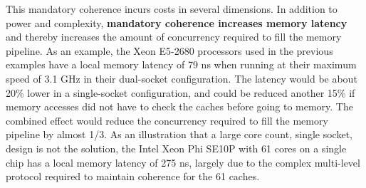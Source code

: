 \begin{comment}
  \heading{Some Hidden Costs of Cache Coherence}

  A general principle in computer architecture is that implementations should be optimized 
  based on the common case and only deal with the unusual case when it happens.   
  Cache coherence is perhaps the most notable exception to this guideline.  Even though
  the overwhelming majority of memory references are to addresses that are not shared
  across processes, architectures provide no means for software to tell hardware that 
  snooping is not required.  As a consequence, the address of every last-level cache miss
  is broadcast to all other last-level caches in the system to ensure that no modified copies
  of the corresponding cache line exist elsewhere in the system.  This mechanism is clearly
  required for shared-memory communication to work, and is just as clearly not needed
  when data is not shared.  (Process migration is a special case that can easily be handled
  by selective cache flushing.)  
\end{comment}

This mandatory coherence incurs costs in several dimensions.  In
addition to power and complexity, \textbf{mandatory coherence
  increases memory latency} and thereby increases the amount of
concurrency required to fill the memory pipeline.  As an example, the
Xeon E5-2680 processors used in the previous examples have a local
memory latency of 79 ns when running at their maximum speed of 3.1 GHz
in their dual-socket configuration.  The latency would be about 20\%
lower in a single-socket configuration, and could be reduced another
15\% if memory accesses did not have to check the caches before going
to memory.  The combined effect would reduce the concurrency required
to fill the memory pipeline by almost 1/3.  As an illustration that a
large core count, single socket, design is not the solution, the Intel
Xeon Phi SE10P with 61 cores on a single chip has a local memory
latency of 275 ns, largely due to the complex multi-level protocol
required to maintain coherence for the 61 caches.

\begin{comment}
  We propose to provide alternate mechanisms for both vertical and horizontal data motion
  that will eliminate most applications of traditional cache coherence.  Whether this is 
  done by extending memory semantics or providing completely independent mechanisms
  is a topic to be researched.
\end{comment}


